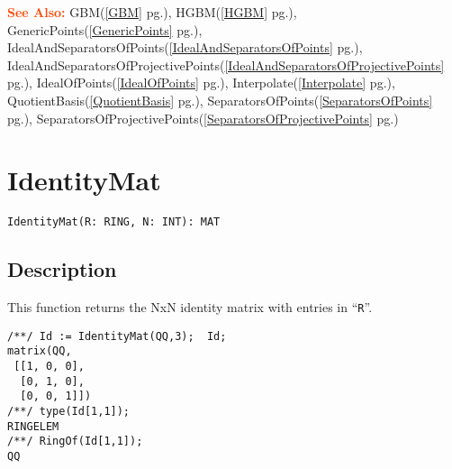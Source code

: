 \documentclass[a4paper]{mybook}
\newenvironment{command}{}{} %
\newcommand\SeeAlso{\par\textcolor{OrangeRed}{\textbf{\large See Also: }}}
\begin{document}
\begin{command}
\SeeAlso %
  GBM(\ref{GBM} pg.\pageref{GBM}), 
    HGBM(\ref{HGBM} pg.\pageref{HGBM}), 
    GenericPoints(\ref{GenericPoints} pg.\pageref{GenericPoints}), 
    IdealAndSeparatorsOfPoints(\ref{IdealAndSeparatorsOfPoints} pg.\pageref{IdealAndSeparatorsOfPoints}), 
    IdealAndSeparatorsOfProjectivePoints(\ref{IdealAndSeparatorsOfProjectivePoints} pg.\pageref{IdealAndSeparatorsOfProjectivePoints}), 
    IdealOfPoints(\ref{IdealOfPoints} pg.\pageref{IdealOfPoints}), 
    Interpolate(\ref{Interpolate} pg.\pageref{Interpolate}), 
    QuotientBasis(\ref{QuotientBasis} pg.\pageref{QuotientBasis}), 
    SeparatorsOfPoints(\ref{SeparatorsOfPoints} pg.\pageref{SeparatorsOfPoints}), 
    SeparatorsOfProjectivePoints(\ref{SeparatorsOfProjectivePoints} pg.\pageref{SeparatorsOfProjectivePoints})
\end{command} %

\section{IdentityMat}
\label{IdentityMat}
\begin{command} %


\begin{Verbatim}[label=syntax, rulecolor=\color{MidnightBlue},
frame=single]
IdentityMat(R: RING, N: INT): MAT
\end{Verbatim}


\subsection*{Description}

This function returns the NxN identity matrix with entries in ``\verb&R&''.
\begin{Verbatim}[label=example, rulecolor=\color{PineGreen}, frame=single]
/**/ Id := IdentityMat(QQ,3);  Id;
matrix(QQ,
 [[1, 0, 0],
  [0, 1, 0],
  [0, 0, 1]])
/**/ type(Id[1,1]);
RINGELEM
/**/ RingOf(Id[1,1]);
QQ
\end{Verbatim}


\end{command} %
\end{document}
